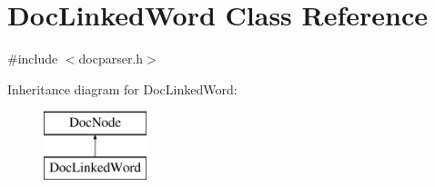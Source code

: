 \hypertarget{class_doc_linked_word}{}\section{Doc\+Linked\+Word Class Reference}
\label{class_doc_linked_word}


{\ttfamily \#include $<$docparser.\+h$>$}

Inheritance diagram for Doc\+Linked\+Word\+:\begin{figure}[H]
\begin{center}
\leavevmode
\includegraphics[height=2.000000cm]{class_doc_linked_word}
\end{center}
\end{figure}
